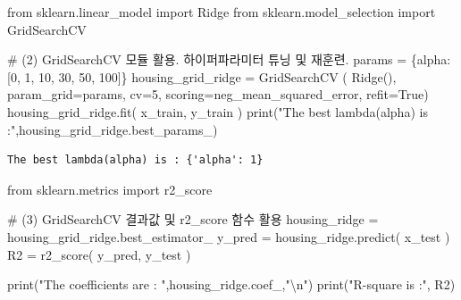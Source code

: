 \documentclass[
  letterpaper,
  DIV=11,
  numbers=noendperiod]{scrartcl}
\newenvironment{Shaded}{\begin{snugshade}}{\end{snugshade}}
\newcommand{\BuiltInTok}[1]{\textcolor[rgb]{0.00,0.23,0.31}{#1}}
\newcommand{\CharTok}[1]{\textcolor[rgb]{0.13,0.47,0.30}{#1}}
\newcommand{\CommentTok}[1]{\textcolor[rgb]{0.37,0.37,0.37}{#1}}
\newcommand{\DecValTok}[1]{\textcolor[rgb]{0.68,0.00,0.00}{#1}}
\newcommand{\ImportTok}[1]{\textcolor[rgb]{0.00,0.46,0.62}{#1}}
\newcommand{\NormalTok}[1]{\textcolor[rgb]{0.00,0.23,0.31}{#1}}
\newcommand{\OperatorTok}[1]{\textcolor[rgb]{0.37,0.37,0.37}{#1}}
\newcommand{\StringTok}[1]{\textcolor[rgb]{0.13,0.47,0.30}{#1}}
\newcommand{\VariableTok}[1]{\textcolor[rgb]{0.07,0.07,0.07}{#1}}
\begin{document}
\begin{Shaded}
\begin{Highlighting}[]
\ImportTok{from}\NormalTok{ sklearn.linear\_model }\ImportTok{import}\NormalTok{ Ridge}
\ImportTok{from}\NormalTok{ sklearn.model\_selection }\ImportTok{import}\NormalTok{ GridSearchCV}

\CommentTok{\# (2) GridSearchCV 모듈 활용. 하이퍼파라미터 튜닝 및 재훈련.}
\NormalTok{params }\OperatorTok{=}\NormalTok{ \{}\StringTok{\textquotesingle{}alpha\textquotesingle{}}\NormalTok{: [}\DecValTok{0}\NormalTok{, }\DecValTok{1}\NormalTok{, }\DecValTok{10}\NormalTok{, }\DecValTok{30}\NormalTok{, }\DecValTok{50}\NormalTok{, }\DecValTok{100}\NormalTok{]\}}
\NormalTok{housing\_grid\_ridge }\OperatorTok{=}\NormalTok{ GridSearchCV ( Ridge(),}
\NormalTok{                                    param\_grid}\OperatorTok{=}\NormalTok{params,}
\NormalTok{                                    cv}\OperatorTok{=}\DecValTok{5}\NormalTok{, }
\NormalTok{                                    scoring}\OperatorTok{=}\StringTok{\textquotesingle{}neg\_mean\_squared\_error\textquotesingle{}}\NormalTok{, }
\NormalTok{                                    refit}\OperatorTok{=}\VariableTok{True}\NormalTok{)}
\NormalTok{housing\_grid\_ridge.fit( x\_train, y\_train )}
\BuiltInTok{print}\NormalTok{(}\StringTok{"The best lambda(alpha) is :"}\NormalTok{,housing\_grid\_ridge.best\_params\_)}
\end{Highlighting}
\end{Shaded}

\begin{verbatim}
The best lambda(alpha) is : {'alpha': 1}
\end{verbatim}

\begin{Shaded}
\begin{Highlighting}[]
\ImportTok{from}\NormalTok{ sklearn.metrics }\ImportTok{import}\NormalTok{ r2\_score}

\CommentTok{\# (3) GridSearchCV 결과값 및 r2\_score 함수 활용}
\NormalTok{housing\_ridge }\OperatorTok{=}\NormalTok{ housing\_grid\_ridge.best\_estimator\_}
\NormalTok{y\_pred }\OperatorTok{=}\NormalTok{ housing\_ridge.predict( x\_test )}
\NormalTok{R2 }\OperatorTok{=}\NormalTok{ r2\_score( y\_pred, y\_test )}

\BuiltInTok{print}\NormalTok{(}\StringTok{"The coefficients are : "}\NormalTok{,housing\_ridge.coef\_,}\StringTok{"}\CharTok{\textbackslash{}n}\StringTok{"}\NormalTok{)}
\BuiltInTok{print}\NormalTok{(}\StringTok{"R{-}square is :"}\NormalTok{, R2)}
\end{Highlighting}
\end{Shaded}
\end{document}
